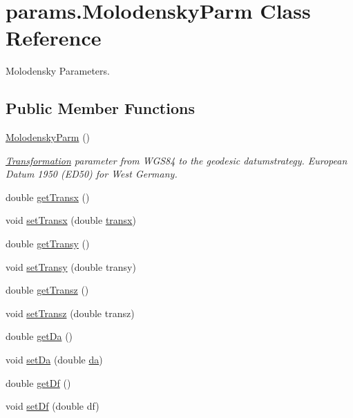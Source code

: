 \hypertarget{classparams_1_1_molodensky_parm}{}\section{params.\+Molodensky\+Parm Class Reference}
\label{classparams_1_1_molodensky_parm}


Molodensky Parameters.  


\subsection*{Public Member Functions}
\begin{DoxyCompactItemize}
\item 
\hyperlink{classparams_1_1_molodensky_parm_a991a43b0db63761d8e98f3c22b67ac5e}{Molodensky\+Parm} ()
\begin{DoxyCompactList}\small\item\em \hyperlink{class_transformation}{Transformation} parameter from W\+G\+S84 to the geodesic datumstrategy. European Datum 1950 (E\+D50) for West Germany. \end{DoxyCompactList}\item 
double \hyperlink{classparams_1_1_molodensky_parm_ae36f49d94cce595bbcc54f415b067090}{get\+Transx} ()
\item 
void \hyperlink{classparams_1_1_molodensky_parm_a9a411659ba7a29544f291e1df02a6dff}{set\+Transx} (double \hyperlink{classparams_1_1_molodensky_parm_a398db3a8717a07b0ba3bead52a2ab328}{transx})
\item 
double \hyperlink{classparams_1_1_molodensky_parm_aa5b210eca194d5b29d094af041b58c4d}{get\+Transy} ()
\item 
void \hyperlink{classparams_1_1_molodensky_parm_a70a7882c10ac21dcae11c3485686a346}{set\+Transy} (double transy)
\item 
double \hyperlink{classparams_1_1_molodensky_parm_ab2aad11feb07ccae05114a4824f99b1d}{get\+Transz} ()
\item 
void \hyperlink{classparams_1_1_molodensky_parm_a1268b870dd08c2807b791e0ca4899585}{set\+Transz} (double transz)
\item 
double \hyperlink{classparams_1_1_molodensky_parm_a16e2ec3bd6a408184f8495ca52345b28}{get\+Da} ()
\item 
void \hyperlink{classparams_1_1_molodensky_parm_abacc786b70e541407bce9adfc1334a21}{set\+Da} (double \hyperlink{classparams_1_1_molodensky_parm_a1c88f8e58b8c4c702938f7ca54730dfb}{da})
\item 
double \hyperlink{classparams_1_1_molodensky_parm_a1bfa75066b9281ce813c952bb4a777eb}{get\+Df} ()
\item 
void \hyperlink{classparams_1_1_molodensky_parm_a67e79048894ac79ae6ed2f3161cbd659}{set\+Df} (double df)
\end{DoxyCompactItemize}
